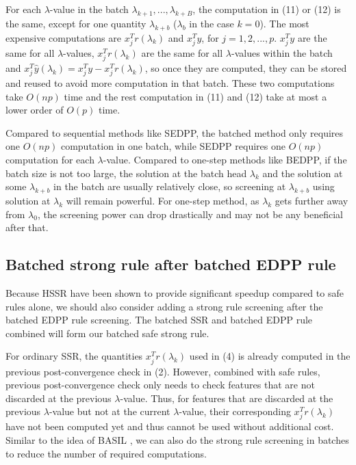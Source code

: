 \documentclass{article}
\begin{document}
For each $\lambda$-value in the batch $\lambda_{k+1},...,\lambda_{k+B}$, the computation in (11) or (12) is the same, except for one quantity $\lambda_{k+b}$ ($\lambda_b$ in the case $k=0$). The most expensive computations are $x_j^Tr(\lambda_k)$ and $x_j^Ty$, for $j=1,2,...,p$. $x_j^Ty$ are the same for all $\lambda$-values, $x_j^Tr(\lambda_k)$ are the same for all $\lambda$-values within the batch and $x_j^T\hat{y}(\lambda_k)=x_j^Ty-x_j^Tr(\lambda_k)$, so once they are computed, they can be stored and reused to avoid more computation in that batch. These two computations take $O(np)$ time and the rest computation in (11) and (12) take at most a lower order of $O(p)$ time.

Compared to sequential methods like SEDPP, the batched method only requires one $O(np)$ computation in one batch, while SEDPP requires one $O(np)$ computation for each $\lambda$-value. Compared to one-step methods like BEDPP, if the batch size is not too large, the solution at the batch head $\lambda_k$ and the solution at some $\lambda_{k+b}$ in the batch are usually relatively close, so screening at $\lambda_{k+b}$ using solution at $\lambda_k$ will remain powerful. For one-step method, as $\lambda_k$ gets further away from $\lambda_0$, the screening power can drop drastically and
may not be any beneficial after that.

\subsection{Batched strong rule after batched EDPP rule}

Because HSSR \cite{zeng2017efficient} have been shown to provide significant speedup compared to safe rules alone, we should also consider adding a strong rule screening after the batched EDPP rule screening. The batched SSR and batched EDPP rule combined will form our batched safe strong rule.

For ordinary SSR, the quantities $x_j^Tr(\lambda_k)$ used in (4) is already computed in the previous post-convergence check in (2). However, combined with safe rules, previous post-convergence check only needs to check features that are not discarded at the previous $\lambda$-value. Thus, for features that are discarded at the previous $\lambda$-value but not at the current $\lambda$-value, their corresponding $x_j^Tr(\lambda_k)$ have not been computed yet and thus cannot be used without additional cost. Similar to the idea of BASIL \cite{qian2019fast}, we can also do the strong rule screening in batches to reduce the number of required computations.
\end{document}
